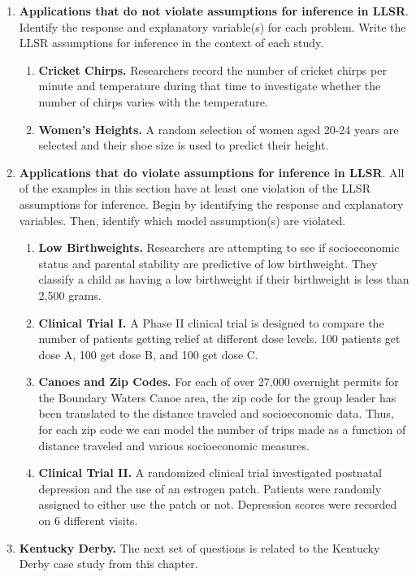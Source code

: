 \documentclass[
]{krantz}
\providecommand{\tightlist}{%
  \setlength{\itemsep}{0pt}\setlength{\parskip}{0pt}}
\begin{document}
\begin{enumerate}
\def\labelenumi{\arabic{enumi}.}
\item
  \textbf{Applications that do not violate assumptions for inference in LLSR}. Identify the response and explanatory variable(s) for each problem. Write the LLSR assumptions for inference in the context of each study.

  \begin{enumerate}
  \def\labelenumii{\alph{enumii}.}
  \tightlist
  \item
    \textbf{Cricket Chirps.} Researchers record the number of cricket chirps per minute and temperature during that time to investigate whether the number of chirps varies with the temperature.
  \item
    \textbf{Women's Heights.} A random selection of women aged 20-24 years are selected and their shoe size is used to predict their height.\\
  \end{enumerate}
\item
  \textbf{Applications that do violate assumptions for inference in LLSR}. All of the examples in this section have at least one violation of the LLSR assumptions for inference. Begin by identifying the response and explanatory variables. Then, identify which model assumption(s) are violated.

  \begin{enumerate}
  \def\labelenumii{\alph{enumii}.}
  \tightlist
  \item
    \textbf{Low Birthweights.} Researchers are attempting to see if socioeconomic status and parental stability are predictive of low birthweight. They classify a child as having a low birthweight if their birthweight is less than 2,500 grams.
  \item
    \textbf{Clinical Trial I.} A Phase II clinical trial is designed to compare the number of patients getting relief at different dose levels. 100 patients get dose A, 100 get dose B, and 100 get dose C.
  \item
    \textbf{Canoes and Zip Codes.} For each of over 27,000 overnight permits for the Boundary Waters Canoe area, the zip code for the group leader has been translated to the distance traveled and socioeconomic data. Thus, for each zip code we can model the number of trips made as a function of distance traveled and various socioeconomic measures.
  \item
    \textbf{Clinical Trial II.} A randomized clinical trial investigated postnatal depression and the use of an estrogen patch. Patients were randomly assigned to either use the patch or not. Depression scores were recorded on 6 different visits.
  \end{enumerate}
\item
  \textbf{Kentucky Derby.} The next set of questions is related to the Kentucky Derby case study from this chapter.


\end{enumerate}
\end{document}
